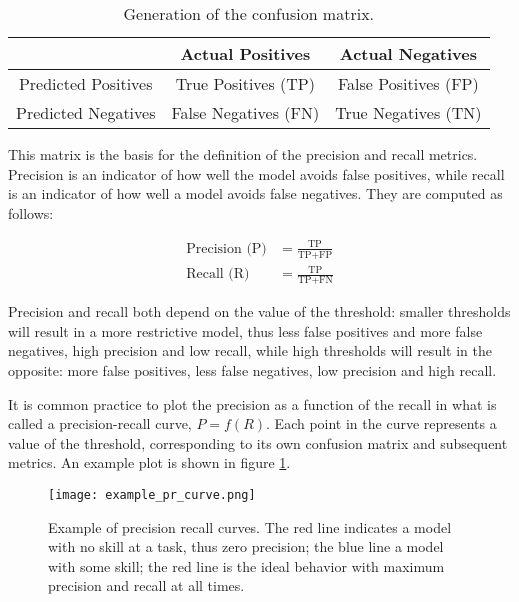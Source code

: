 \begin{table}[ht]
    \begin{center}
        \begin{tabular}{c||c|c}
            \space & Actual Positives & Actual Negatives\\
            \hline\hline
            Predicted Positives & True Positives (TP)& False Positives (FP)\\
            \hline
            Predicted Negatives & False Negatives (FN)& True Negatives (TN)\\
        \end{tabular}
        \caption{Generation of the confusion matrix.}
        \label{confusionmatrix}
    \end{center}
\end{table}

This matrix is the basis for the definition of the precision and recall metrics. Precision is an indicator of how well the model avoids false positives, while recall is an indicator of how well a model avoids false negatives. They are computed as follows:

\begin{align*}
    \text{Precision (P)} &= \frac{\text{TP}}{\text{TP} + \text{FP}}\\
    \text{Recall (R)} &= \frac{\text{TP}}{\text{TP} + \text{FN}}
\end{align*}

Precision and recall both depend on the value of the threshold: smaller thresholds will result in a more restrictive model, thus less false positives and more false negatives, high precision and low recall, while high thresholds will result in the opposite: more false positives, less false negatives, low precision and high recall.

It is common practice to plot the precision as a function of the recall in what is called a precision-recall curve, $P = f(R)$. Each point in the curve represents a value of the threshold, corresponding to its own confusion matrix and subsequent metrics. An example plot is shown in figure \ref{example_pr}.

\begin{figure}[ht]
    \texttt{[image: example\_pr\_curve.png]}
    \caption{Example of precision recall curves. The red line indicates a model with no skill at a task, thus zero precision; the blue line a model with some skill; the red line is the ideal behavior with maximum precision and recall at all times.}
    \label{example_pr}
\end{figure}

